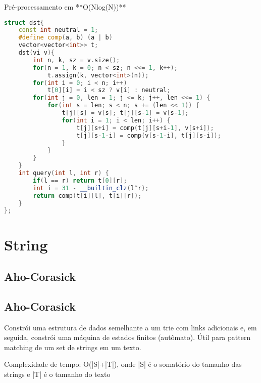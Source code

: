 \documentclass[11pt, a4paper, twoside]{article}
\begin{document}
Pré-processamento em **O(Nlog(N))**
\begin{lstlisting}[language=C++]
struct dst{
    const int neutral = 1;
    #define comp(a, b) (a | b)
    vector<vector<int>> t;
    dst(vi v){
        int n, k, sz = v.size();
        for(n = 1, k = 0; n < sz; n <<= 1, k++);
            t.assign(k, vector<int>(n));
        for(int i = 0; i < n; i++)
            t[0][i] = i < sz ? v[i] : neutral;
        for(int j = 0, len = 1; j <= k; j++, len <<= 1) {
            for(int s = len; s < n; s += (len << 1)) {
                t[j][s] = v[s]; t[j][s-1] = v[s-1];
                for(int i = 1; i < len; i++) {
                    t[j][s+i] = comp(t[j][s+i-1], v[s+i]);
                    t[j][s-1-i] = comp(v[s-1-i], t[j][s-i]);
                }
            }
        }
    }
    int query(int l, int r) {
        if(l == r) return t[0][r];
        int i = 31 - __builtin_clz(l^r);
        return comp(t[i][l], t[i][r]);
    }
};
\end{lstlisting}

\newpage
%
%
%
%

\section{String}

\subsection{Aho-Corasick}

\subsection{Aho-Corasick}


Constrói uma estrutura de dados semelhante a um trie com links adicionais e, em seguida, constrói uma máquina de estados finitos (autômato). Útil para pattern matching de um set de strings em um texto.

Complexidade de tempo: O(|S|+|T|), onde |S| é o somatório do tamanho das strings e |T| é o tamanho do texto
\end{document}
